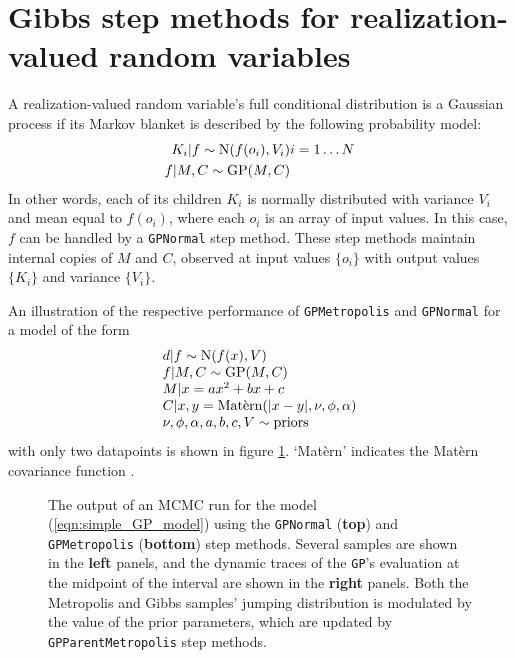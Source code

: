 \documentclass{report}
\begin{document}
\section{Gibbs step methods for realization-valued random variables}
A realization-valued random variable's full conditional distribution \cite{gilks} is a Gaussian process if its Markov blanket \cite{jensen} is described by the following probability model:
\begin{eqnarray*}
    K_i |f \sim \textup{N}(f(o_i), V_i) & i=1\ldots N\\
    f|M,C\sim\textup{GP}(M,C)
\end{eqnarray*}
In other words, each of its children $K_i$ is normally distributed with variance $V_i$ and mean equal to $f(o_i)$, where each $o_i$ is an array of input values. In this case, $f$ can be handled by a \texttt{GPNormal} step method. These step methods maintain internal copies of $M$ and $C$, observed at input values $\{o_i\}$ with output values $\{K_i\}$ and variance $\{V_i\}$.

An illustration of the respective performance of \texttt{GPMetropolis} and \texttt{GPNormal} for a model of the form
\begin{equation}
    \label{eqn:simple_GP_model}
    \begin{array}{l}
        d|f \sim \textup{N}(f(x),V)\\
        f|M,C\sim \textup{GP}(M,C)\\
        M|x= ax^2+bx+c\\
        C|x,y= \textup{Mat\`ern}(|x-y|,\nu, \phi, \alpha)\\
        \nu,\phi,\alpha,a,b,c,V\sim \textup{priors}
    \end{array}
\end{equation}
with only two datapoints is shown in figure \ref{fig:MCMCOutput}. `Mat\`ern' indicates the Mat\`ern covariance function \cite{Banerjee}.

\begin{figure}
    \centering
    \caption{The output of an MCMC run for the model (\ref{eqn:simple_GP_model}) using the \texttt{GPNormal} (\textbf{top}) and \texttt{GPMetropolis} (\textbf{bottom}) step methods. Several samples are shown in the \textbf{left} panels, and the dynamic traces of the \texttt{GP}'s evaluation at the midpoint of the interval are shown in the \textbf{right} panels. Both the Metropolis and Gibbs samples' jumping distribution is modulated by the value of the prior parameters, which are updated by \texttt{GPParentMetropolis} step methods.}
    \label{fig:MCMCOutput}
\end{figure}
\end{document}
